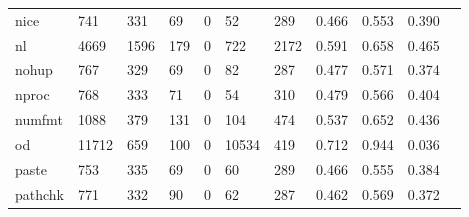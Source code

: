 \begin{longtable}{lp{1.10cm}p{1.10cm}p{1.10cm}p{1.10cm}p{1.10cm}p{1.10cm}p{1.10cm}p{1.10cm}p{1.10cm}p{1.10cm}}
nice      &                    741 &                                331 &                                69 &                                0 &                                52 &                             289 &                          0.466 &                                 0.553 &                               0.390 \\
nl        &                   4669 &                               1596 &                               179 &                                0 &                               722 &                            2172 &                          0.591 &                                 0.658 &                               0.465 \\
nohup     &                    767 &                                329 &                                69 &                                0 &                                82 &                             287 &                          0.477 &                                 0.571 &                               0.374 \\
nproc     &                    768 &                                333 &                                71 &                                0 &                                54 &                             310 &                          0.479 &                                 0.566 &                               0.404 \\
numfmt    &                   1088 &                                379 &                               131 &                                0 &                               104 &                             474 &                          0.537 &                                 0.652 &                               0.436 \\
od        &                  11712 &                                659 &                               100 &                                0 &                             10534 &                             419 &                          0.712 &                                 0.944 &                               0.036 \\
paste     &                    753 &                                335 &                                69 &                                0 &                                60 &                             289 &                          0.466 &                                 0.555 &                               0.384 \\
pathchk   &                    771 &                                332 &                                90 &                                0 &                                62 &                             287 &                          0.462 &                                 0.569 &                               0.372 \\

\end{longtable}
